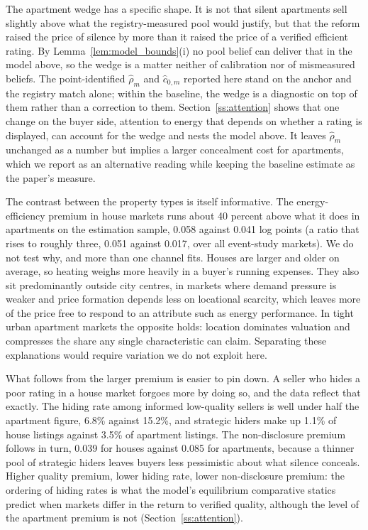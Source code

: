 The apartment wedge has a specific shape. It is not that silent apartments sell slightly above what
the registry-measured pool would justify, but that the reform raised the price of silence by more
than it raised the price of a verified efficient rating. By Lemma~\ref{lem:model_bounds}(i) no pool
belief can deliver that in the model above, so the wedge is a matter neither of calibration nor of
mismeasured beliefs. The point-identified $\hat\rho_m$ and $\hat c_{0,m}$ reported here stand on the
anchor and the registry match alone; within the baseline, the wedge is a diagnostic on top of them
rather than a correction to them. Section~\ref{ss:attention} shows that one change on the buyer side,
attention to energy that depends on whether a rating is displayed, can account for the wedge and
nests the model above. It leaves $\hat\rho_m$ unchanged as a number but implies a larger concealment
cost for apartments, which we report as an alternative reading while keeping the baseline estimate
as the paper's measure.

The contrast between the property types is itself informative. The energy-efficiency premium in
house markets runs about 40 percent above what it does in apartments on the estimation sample,
0.058 against 0.041 log points (a ratio that rises to roughly three, 0.051 against 0.017, over all
event-study markets). We do not test why, and more than one channel fits. Houses are larger and older on
average, so heating weighs more heavily in a buyer's running expenses. They also sit
predominantly outside city centres, in markets where demand pressure is weaker and price
formation depends less on locational scarcity, which leaves more of the price free to respond to
an attribute such as energy performance. In tight urban apartment markets the opposite holds:
location dominates valuation and compresses the share any single characteristic can claim.
Separating these explanations would require variation we do not exploit here.

What follows from the larger premium is easier to pin down. A seller who hides a poor rating in a
house market forgoes more by doing so, and the data reflect that exactly. The hiding rate among
informed low-quality sellers is well under half the apartment figure, 6.8\% against 15.2\%, and
strategic hiders make up 1.1\% of house listings against 3.5\% of apartment listings. The
non-disclosure premium follows in turn, 0.039 for houses against 0.085 for apartments, because a
thinner pool of strategic hiders leaves buyers less pessimistic about what silence conceals.
Higher quality premium, lower hiding rate, lower non-disclosure premium: the ordering of hiding
rates is what the model's equilibrium comparative statics predict when markets differ in the return to
verified quality, although the level of the apartment premium is not (Section~\ref{ss:attention}).
